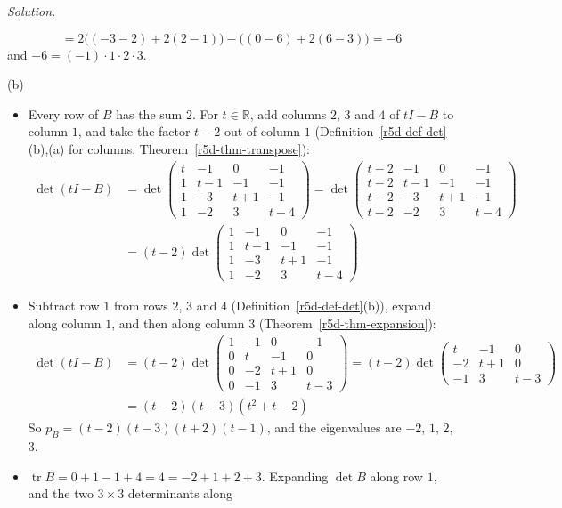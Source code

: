 \documentclass[12pt]{article}
\newcommand{\R}{\mathbb R}
\DeclareMathOperator{\tr}{tr}
\theoremstyle{definition}
\newenvironment{solution}{\par\noindent\textit{Solution.}\ }{\par\smallskip}
\begin{document}
\begin{solution}
\begin{itemize}
\[=2\bigl((-3-2)+2(2-1)\bigr)-\bigl((0-6)+2(6-3)\bigr)=-6
\]
and \(-6=(-1)\cdot1\cdot2\cdot3\).
\end{itemize}
(b)
\begin{itemize}
\item Every row of \(B\) has the sum \(2\). For \(t\in\R\), add columns \(2\), \(3\) and \(4\) of \(tI-B\) to column \(1\),
and take the factor \(t-2\) out of column \(1\) (Definition~\ref{r5d-def-det}(b),(a) for columns,
Theorem~\ref{r5d-thm-transpose}):
\[
\begin{aligned}
\det(tI-B)&=\det\begin{pmatrix}t&-1&0&-1\\1&t-1&-1&-1\\1&-3&t+1&-1\\1&-2&3&t-4\end{pmatrix}
=\det\begin{pmatrix}t-2&-1&0&-1\\t-2&t-1&-1&-1\\t-2&-3&t+1&-1\\t-2&-2&3&t-4\end{pmatrix}\\
&=(t-2)\det\begin{pmatrix}1&-1&0&-1\\1&t-1&-1&-1\\1&-3&t+1&-1\\1&-2&3&t-4\end{pmatrix}
\end{aligned}
\]
\item Subtract row \(1\) from rows \(2\), \(3\) and \(4\) (Definition~\ref{r5d-def-det}(b)), expand along column \(1\),
and then along column \(3\) (Theorem~\ref{r5d-thm-expansion}):
\[
\begin{aligned}
\det(tI-B)&=(t-2)\det\begin{pmatrix}1&-1&0&-1\\0&t&-1&0\\0&-2&t+1&0\\0&-1&3&t-3\end{pmatrix}
=(t-2)\det\begin{pmatrix}t&-1&0\\-2&t+1&0\\-1&3&t-3\end{pmatrix}\\
&=(t-2)(t-3)(t^2+t-2)
\end{aligned}
\]
So \(p_B=(t-2)(t-3)(t+2)(t-1)\), and the eigenvalues are \(-2\), \(1\), \(2\), \(3\).
\item \(\tr B=0+1-1+4=4=-2+1+2+3\). Expanding \(\det B\) along row \(1\), and the two \(3\times3\) determinants along

\end{itemize}
\end{solution}
\end{document}
